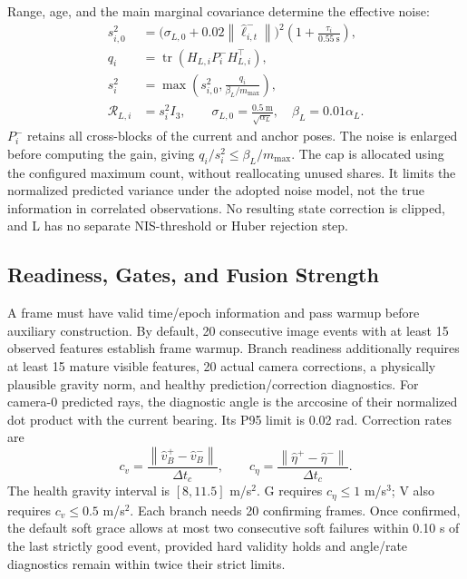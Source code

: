 \documentclass[a4paper,runningheads,twocolumn]{llncs}
\newcommand{\tr}{\operatorname{tr}}
\newcommand{\norm}[1]{\left\lVert #1\right\rVert}
\begin{document}
Range, age, and the main marginal covariance determine the effective noise:
\begin{equation}
 \begin{aligned}
 s_{i,0}^2&=\big(\sigma_{L,0}+0.02\norm{\hat\ell_{i,t}^-}\big)^2
       \left(1+\frac{\tau_i}{0.55~\mathrm{s}}\right),\\
 q_i&=\tr(H_{L,i}P_i^-H_{L,i}^{\top}),\\
 s_i^2&=\max\left(s_{i,0}^2,\frac{q_i}{\beta_L/m_{\max}}\right),\\
 \mathcal R_{L,i}&=s_i^2I_3,\qquad
 \sigma_{L,0}=\frac{0.5~\mathrm m}{\sqrt{\alpha_L}},\quad
 \beta_L=0.01\alpha_L.
 \end{aligned}
 \label{eq:lbudget}
\end{equation}
$P_i^-$ retains all cross-blocks of the current and anchor poses. The noise is enlarged before computing the gain, giving $q_i/s_i^2\leq\beta_L/m_{\max}$. The cap is allocated using the configured maximum count, without reallocating unused shares. It limits the normalized predicted variance under the adopted noise model, not the true information in correlated observations. No resulting state correction is clipped, and L has no separate NIS-threshold or Huber rejection step.

\subsection{Readiness, Gates, and Fusion Strength}
A frame must have valid time/epoch information and pass warmup before auxiliary construction. By default, 20 consecutive image events with at least 15 observed features establish frame warmup. Branch readiness additionally requires at least 15 mature visible features, 20 actual camera corrections, a physically plausible gravity norm, and healthy prediction/correction diagnostics. For camera-0 predicted rays, the diagnostic angle is the arccosine of their normalized dot product with the current bearing. Its P95 limit is 0.02 rad. Correction rates are
\begin{equation}
 c_v=\frac{\norm{\hat v_B^+-\hat v_B^-}}{\Delta t_c},\qquad
 c_\eta=\frac{\norm{\hat\eta^+-\hat\eta^-}}{\Delta t_c}.
 \label{eq:healthrates}
\end{equation}
The health gravity interval is $[8,11.5]$ m/s$^2$. G requires $c_\eta\leq1$ m/s$^3$; V also requires $c_v\leq0.5$ m/s$^2$. Each branch needs 20 confirming frames. Once confirmed, the default soft grace allows at most two consecutive soft failures within 0.10 s of the last strictly good event, provided hard validity holds and angle/rate diagnostics remain within twice their strict limits.
\end{document}
